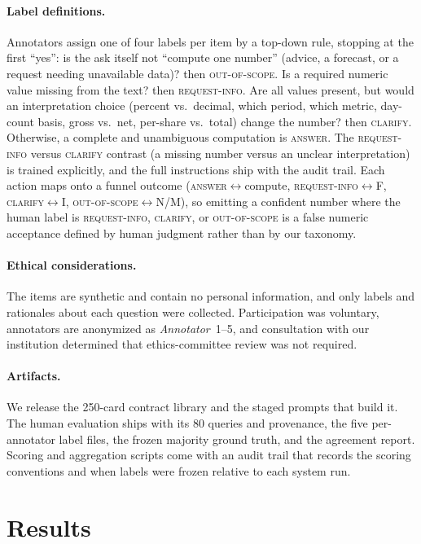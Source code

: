 \documentclass[sigconf,anonymous]{acmart}
\begin{document}
\paragraph{Label definitions.}
Annotators assign one of four labels per item by a top-down rule, stopping at the first ``yes'': is the ask itself not ``compute one number'' (advice, a forecast, or a request needing unavailable data)? then \textsc{out-of-scope}. Is a required numeric value missing from the text? then \textsc{request-info}. Are all values present, but would an interpretation choice (percent vs.\ decimal, which period, which metric, day-count basis, gross vs.\ net, per-share vs.\ total) change the number? then \textsc{clarify}. Otherwise, a complete and unambiguous computation is \textsc{answer}.
The \textsc{request-info} versus \textsc{clarify} contrast (a missing number versus an unclear interpretation) is trained explicitly, and the full instructions ship with the audit trail.
Each action maps onto a funnel outcome (\textsc{answer}$\leftrightarrow$compute, \textsc{request-info}$\leftrightarrow$F, \textsc{clarify}$\leftrightarrow$I, \textsc{out-of-scope}$\leftrightarrow$N/M), so emitting a confident number where the human label is \textsc{request-info}, \textsc{clarify}, or \textsc{out-of-scope} is a false numeric acceptance defined by human judgment rather than by our taxonomy.

\paragraph{Ethical considerations.}
The items are synthetic and contain no personal information, and only labels and rationales about each question were collected. Participation was voluntary, annotators are anonymized as \textit{Annotator}~1--5, and consultation with our institution determined that ethics-committee review was not required.

\paragraph{Artifacts.}
We release the 250-card contract library and the staged prompts that build it. The human evaluation ships with its 80 queries and provenance, the five per-annotator label files, the frozen majority ground truth, and the agreement report. Scoring and aggregation scripts come with an audit trail that records the scoring conventions and when labels were frozen relative to each system run.


\section{Results}\label{sec:v2res}
\end{document}
